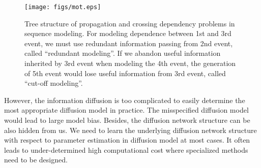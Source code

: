 
\begin{figure}[t]
\label{fig:mot}
\centering
\texttt{[image: figs/mot.eps]}
\caption{Tree structure of propagation and crossing dependency problems in
sequence modeling. For modeling dependence between 1st and 3rd event, we must
use redundant information passing from 2nd event, called
``redundant modeling''. If we abandon useful information inherited by 3rd
event when modeling the 4th event, the generation of 5th event would lose
useful information from 3rd event, called ``cut-off modeling''.
}
\end{figure}

However, the information diffusion is too complicated to easily determine
the most appropriate diffusion model in practice. The misspecified diffusion
model would lead to large model bias. Besides, the diffusion network structure
can be also hidden from us. We need to learn the underlying
diffusion network structure with respect to parameter estimation in diffusion
model at most cases. It often leads to under-determined high computational cost
where specialized methods need to be designed. 

